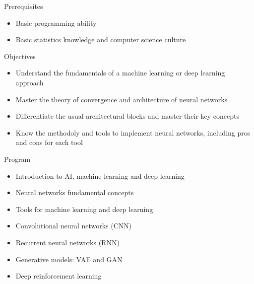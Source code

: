 
\begin{frame}{Prerequisites}
  \begin{itemize}
    \item Basic programming ability
    \item Basic statistics knowledge and computer science culture
  \end{itemize}
\end{frame}

\begin{frame}{Objectives}
  \begin{itemize}
    \item Understand the fundamentals of a machine learning or deep learning approach
    \item Master the theory of convergence and architecture of neural networks
    \item Differentiate the usual architectural blocks and master their key concepts
    \item Know the methodoly and tools to implement neural networks, including pros and cons for each tool
  \end{itemize}
\end{frame}

\begin{frame}{Program}
  \begin{itemize}
    \item Introduction to AI, machine learning and deep learning
    \item Neural networks fundamental concepts
    \item Tools for machine learning and deep learning
    \item Convolutional neural networks (CNN)
    \item Recurrent neural networks (RNN)
    \item Generative models: VAE and GAN
    \item Deep reinforcement learning
  \end{itemize}
\end{frame}
